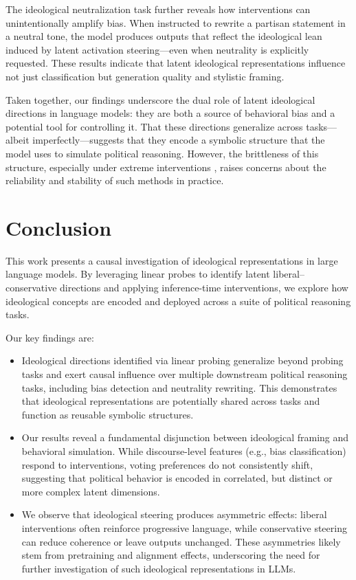\documentclass[11pt]{article}
\begin{document}
The ideological neutralization task further reveals how interventions can unintentionally amplify bias. When instructed to rewrite a partisan statement in a neutral tone, the model produces outputs that reflect the ideological lean induced by latent activation steering—even when neutrality is explicitly requested. These results indicate that latent ideological representations influence not just classification but generation quality and stylistic framing.

Taken together, our findings underscore the dual role of latent ideological directions in language models: they are both a source of behavioral bias and a potential tool for controlling it. That these directions generalize across tasks—albeit imperfectly—suggests that they encode a symbolic structure that the model uses to simulate political reasoning. However, the brittleness of this structure, especially under extreme interventions \citep{kimLinearRepresentationsPolitical2025}, raises concerns about the reliability and stability of such methods in practice.

\section{Conclusion}

This work presents a causal investigation of ideological representations in large language models. By leveraging linear probes to identify latent liberal--conservative directions and applying inference-time interventions, we explore how ideological concepts are encoded and deployed across a suite of political reasoning tasks.

Our key findings are:
\begin{itemize}
    \item Ideological directions identified via linear probing generalize beyond probing tasks and exert causal influence over multiple downstream political reasoning tasks, including bias detection and neutrality rewriting. This demonstrates that ideological representations are potentially shared across tasks and function as reusable symbolic structures.
    
    \item Our results reveal a fundamental disjunction between ideological framing and behavioral simulation. While discourse-level features (e.g., bias classification) respond to interventions, voting preferences do not consistently shift, suggesting that political behavior is encoded in correlated, but distinct or more complex latent dimensions.
    
    \item We observe that ideological steering produces asymmetric effects: liberal interventions often reinforce progressive language, while conservative steering can reduce coherence or leave outputs unchanged. These asymmetries likely stem from pretraining and alignment effects, underscoring the need for further investigation of such ideological representations in LLMs.
\end{itemize}
\end{document}
